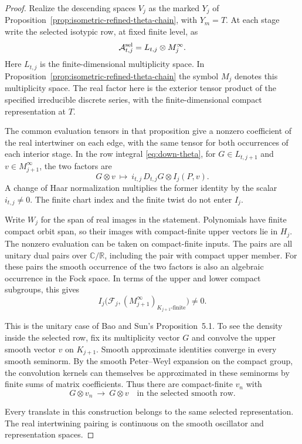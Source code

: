 \begin{proof}
Realize the descending spaces \(V_j\) as the marked \(Y_j\) of
Proposition~\ref{prop:isometric-refined-theta-chain}, with \(Y_m=T\).
At each stage write the selected isotypic row, at fixed finite level, as
\[
       \mathcal A_{t,j}^{\rm sel}
          =L_{t,j}\otimes M_j^\infty .
\]
Here \(L_{t,j}\) is the finite-dimensional multiplicity space. In
Proposition~\ref{prop:isometric-refined-theta-chain} the symbol \(M_j\)
denotes this multiplicity space. The real factor here is the exterior
tensor product of the specified irreducible discrete series, with
the finite-dimensional compact representation at \(T\).

The common evaluation tensors in that proposition give a nonzero
coefficient of the real intertwiner on each edge, with the same
tensor for both occurrences of each interior stage. In the row integral \eqref{eq:down-theta}, for \(G\in L_{t,j+1}\)
and \(v\in M_{j+1}^\infty\), the two factors are
\[
 G\otimes v\ \longmapsto\ i_{t,j}\, D_{t,j}G\otimes I_j(P,v).
\]
A change of Haar normalization multiplies the former
identity by the scalar \(i_{t,j}\ne0\). The finite chart index and
the finite twist do not enter \(I_j\).

Write \(W_j\) for the span of real images in the statement.
Polynomials have finite compact orbit span, so their images with
compact-finite upper vectors lie in \(H_j\).
The nonzero evaluation can be taken on compact-finite inputs. The pairs are all unitary dual pairs over
\(\mathbb C/\mathbb R\), including the pair with compact upper member.
For these pairs the smooth occurrence of the two factors is also an
algebraic occurrence in the Fock space. In terms of the upper and
lower compact subgroups, this gives
\[
 I_j\bigl(\mathcal F_j,(M_{j+1}^\infty)_{K_{j+1}\text{-finite}}\bigr)
                  \ne 0 .
\]

This is the unitary case of Bao and Sun's Proposition~5.1.
\cite{bao-sun-unitary}
To see the density inside the selected row, fix its multiplicity
vector \(G\) and convolve the upper smooth vector \(v\) on
\(K_{j+1}\). Smooth approximate identities converge in every
smooth seminorm. By the smooth Peter--Weyl expansion on the
compact group, the convolution kernels can themselves be approximated
in these seminorms by finite sums of matrix coefficients. Thus there
are compact-finite \(v_n\) with
\[
       G\otimes v_n\ \longrightarrow\ G\otimes v
               \quad\text{in the selected smooth row}.
\]

Every translate in this construction belongs to the same selected
representation. The real intertwining pairing is continuous on the
smooth oscillator and representation spaces.


\end{proof}
